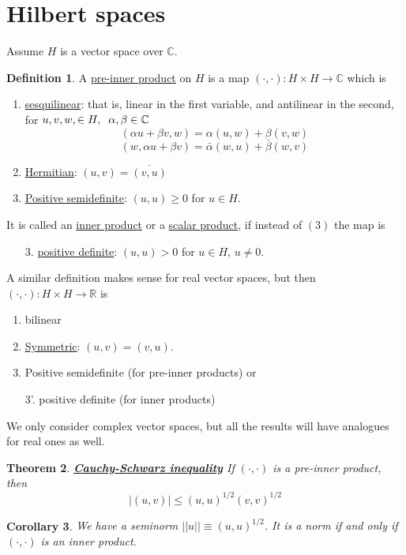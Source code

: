 \documentclass{article}
\newtheorem{theorem}{Theorem}[section]
\newtheorem{corollary}[theorem]{Corollary}
\theoremstyle{definition}
\newtheorem{definition}[theorem]{Definition}
\newcommand{\R}{\mathbb{R}}
\newcommand{\C}{\mathbb{C}}
\newcommand{\tmm}{\hspace{2mm}}
\begin{document}
\section{Hilbert spaces}
Assume $H$ is a vector space over $\C$.
\begin{definition}
    A \underline{pre-inner product} on $H$ is a map $(\cdot,\cdot):H\times H\rightarrow\C$ which is 
    \begin{enumerate}
        \item \underline{sesquilinear}: that is, linear in the first variable, and antilinear in the second, for $u,v,w,\in H,\tmm \alpha,\beta\in\C$
        $$(\alpha u+\beta v,w) = \alpha (u,w)+\beta (v,w)$$
        $$(w,\alpha u+\beta v) = \bar\alpha (w,u) + \bar\beta (w,v)$$
        
        \item \underline{Hermitian}: $(u,v)=\overline{(v,u)}$
        \item \underline{Positive semidefinite}: $(u,u)\geq 0$ for $u\in H$.
    \end{enumerate}
    It is called an \underline{inner product} or a \underline{scalar product}, if instead of $(3)$ the map is
    \begin{enumerate}
        \item[3.]  \underline{positive definite}: $(u,u)>0$ for $u\in H$, $u\neq 0$.
    \end{enumerate}
   A similar definition makes sense for real vector spaces, but then $(\cdot,\cdot):H\times H\rightarrow\R$ is 
   \begin{enumerate}
    \item bilinear
    \item \underline{Symmetric}: $(u,v)=(v,u)$.
    \item Positive semidefinite (for pre-inner products) or 
    \item[3'.] positive definite (for inner products) 
   \end{enumerate}
   We only consider complex vector spaces, but all the results will have analogues for real ones as well.
\end{definition}

\begin{theorem}\underline{\textbf{Cauchy-Schwarz inequality}}
    If $(\cdot,\cdot)$ is a pre-inner product, then $$|(u,v)|\leq (u,u)^{1/2}(v,v)^{1/2}$$
    
\end{theorem}
\begin{corollary}
    We have a seminorm $||u||\equiv (u,u)^{1/2}$. It is a norm if and only if $(\cdot,\cdot)$ is an inner product. 
\end{corollary}
\end{document}
